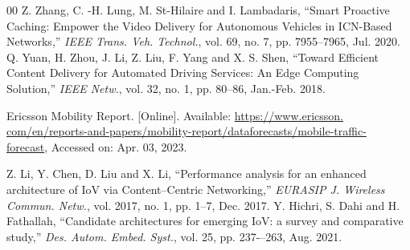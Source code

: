 \documentclass[journal]{IEEEtran}
\begin{document}
\begin{thebibliography}{00}
 Z. Zhang, C. -H. Lung, M. St-Hilaire and I. Lambadaris,  ``Smart Proactive Caching: Empower the Video Delivery for Autonomous Vehicles in ICN-Based Networks,'' \emph{IEEE Trans. Veh. Technol.}, vol. 69, no. 7, pp. 7955--7965, Jul. 2020.
 Q. Yuan, H. Zhou, J. Li, Z. Liu, F. Yang and X. S. Shen,  ``Toward Efficient Content Delivery for Automated Driving Services: An Edge Computing Solution,'' \emph{IEEE Netw.}, vol. 32, no. 1, pp. 80--86, Jan.-Feb. 2018.

Ericsson Mobility Report. [Online]. Available: \underline{https://www.ericsson.}\\\underline{com/en/reports-and-papers/mobility-report/dataforecasts/mobile-traffic-}\\\underline{forecast}, Accessed on: Apr. 03, 2023.


 Z. Li, Y. Chen, D. Liu and X. Li, ``Performance analysis for an enhanced architecture of IoV via Content--Centric Networking,'' \emph{EURASIP J. Wireless Commun. Netw.}, vol. 2017, no. 1, pp. 1--7, Dec. 2017.
 Y. Hichri, S. Dahi and H. Fathallah, ``Candidate architectures for emerging IoV: a survey and comparative study,'' \emph{Des. Autom. Embed. Syst.}, vol. 25, pp. 237-–263, Aug. 2021.


\end{thebibliography}
\end{document}
